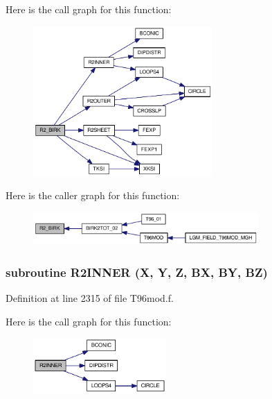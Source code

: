 Here is the call graph for this function:\nopagebreak
\begin{figure}[H]
\begin{center}
\leavevmode
\includegraphics[width=194pt]{_t96mod_8f_75644447b8b698b1ea33e1bc67aba7af_cgraph}
\end{center}
\end{figure}


Here is the caller graph for this function:\nopagebreak
\begin{figure}[H]
\begin{center}
\leavevmode
\includegraphics[width=244pt]{_t96mod_8f_75644447b8b698b1ea33e1bc67aba7af_icgraph}
\end{center}
\end{figure}
\hypertarget{_t96mod_8f_717e6c5b669e682bef3f33b1a4a73796}{
\subsubsection[{R2INNER}]{\setlength{\rightskip}{0pt plus 5cm}subroutine R2INNER (X, \/  Y, \/  Z, \/  BX, \/  BY, \/  BZ)}}
\label{_t96mod_8f_717e6c5b669e682bef3f33b1a4a73796}




Definition at line 2315 of file T96mod.f.

Here is the call graph for this function:\nopagebreak
\begin{figure}[H]
\begin{center}
\leavevmode
\includegraphics[width=144pt]{_t96mod_8f_717e6c5b669e682bef3f33b1a4a73796_cgraph}
\end{center}
\end{figure}


